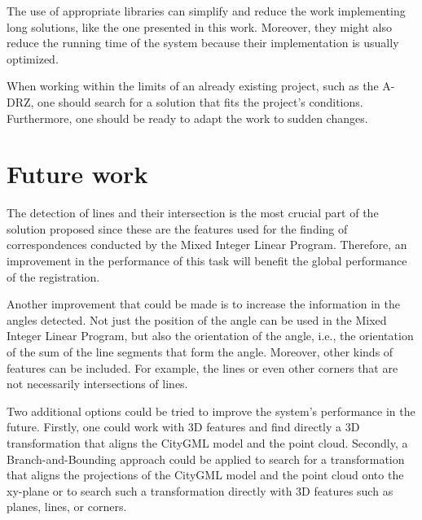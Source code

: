         The use of appropriate libraries can simplify and reduce the work implementing long solutions, like the one presented in this work. 
        Moreover, they might also reduce the running time of the system because their implementation is usually optimized. 
    
        When working within the limits of an already existing project, such as the A-DRZ, 
        one should search for a solution that fits the project’s conditions. 
        Furthermore, one should be ready to adapt the work to sudden changes.
    
    \section{Future work}
        The detection of lines and their intersection is the most crucial part of the solution proposed since these are the features used 
        for the finding of correspondences conducted by the Mixed Integer Linear Program. 
        Therefore, an improvement in the performance of this task will benefit the global performance of the registration.

        Another improvement that could be made is to increase the information in the angles detected. 
        Not just the position of the angle can be used in the Mixed Integer Linear Program, but also the orientation of the angle, 
        i.e., the orientation of the sum of the line segments that form the angle.
        Moreover, other kinds of features can be included. For example, the lines or even other corners that are not necessarily intersections of lines.

        Two additional options could be tried to improve the system’s performance in the future. 
        Firstly, one could work with 3D features and find directly a 3D transformation that aligns the CityGML model and the point cloud. 
        Secondly, a Branch-and-Bounding approach \cite{Bazin_2013_abranchandbound,Breuel_2003_implementation,Brown_2015_globally,Brown_2019_afamily} 
        could be applied to search for a transformation that aligns the projections of the CityGML model and the point cloud onto the xy-plane 
        or to search such a transformation directly with 3D features such as planes, lines, or corners.  


